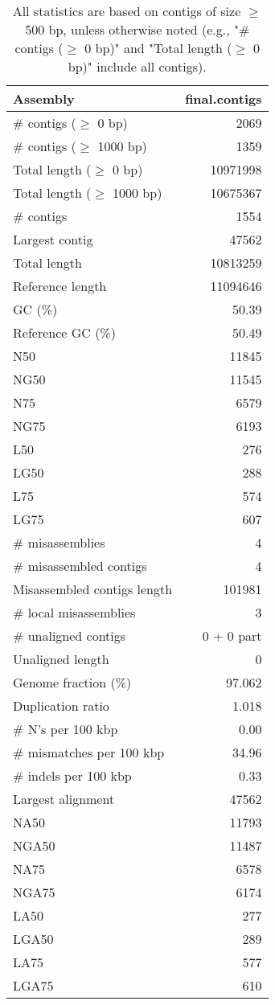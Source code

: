 \documentclass[12pt,a4paper]{article}
\begin{document}
\begin{table}[ht]
\begin{center}
\caption{All statistics are based on contigs of size $\geq$ 500 bp, unless otherwise noted (e.g., "\# contigs ($\geq$ 0 bp)" and "Total length ($\geq$ 0 bp)" include all contigs).}
\begin{tabular}{|l*{1}{|r}|}
\hline
Assembly & final.contigs \\ \hline
\# contigs ($\geq$ 0 bp) & 2069 \\ \hline
\# contigs ($\geq$ 1000 bp) & 1359 \\ \hline
Total length ($\geq$ 0 bp) & 10971998 \\ \hline
Total length ($\geq$ 1000 bp) & 10675367 \\ \hline
\# contigs & 1554 \\ \hline
Largest contig & 47562 \\ \hline
Total length & 10813259 \\ \hline
Reference length & 11094646 \\ \hline
GC (\%) & 50.39 \\ \hline
Reference GC (\%) & 50.49 \\ \hline
N50 & 11845 \\ \hline
NG50 & 11545 \\ \hline
N75 & 6579 \\ \hline
NG75 & 6193 \\ \hline
L50 & 276 \\ \hline
LG50 & 288 \\ \hline
L75 & 574 \\ \hline
LG75 & 607 \\ \hline
\# misassemblies & 4 \\ \hline
\# misassembled contigs & 4 \\ \hline
Misassembled contigs length & 101981 \\ \hline
\# local misassemblies & 3 \\ \hline
\# unaligned contigs & 0 + 0 part \\ \hline
Unaligned length & 0 \\ \hline
Genome fraction (\%) & 97.062 \\ \hline
Duplication ratio & 1.018 \\ \hline
\# N's per 100 kbp & 0.00 \\ \hline
\# mismatches per 100 kbp & 34.96 \\ \hline
\# indels per 100 kbp & 0.33 \\ \hline
Largest alignment & 47562 \\ \hline
NA50 & 11793 \\ \hline
NGA50 & 11487 \\ \hline
NA75 & 6578 \\ \hline
NGA75 & 6174 \\ \hline
LA50 & 277 \\ \hline
LGA50 & 289 \\ \hline
LA75 & 577 \\ \hline
LGA75 & 610 \\ \hline
\end{tabular}
\end{center}
\end{table}
\end{document}
